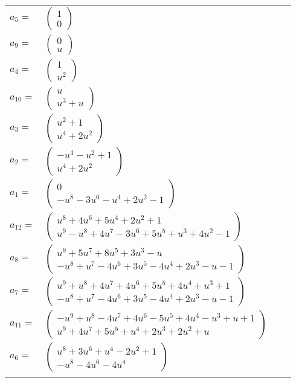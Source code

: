 \documentclass[1p]{elsarticle_modified}
\theoremstyle{definition}
\begin{document}
\begin{tabular}{m{7pt} m{180pt} m{7pt} m{180pt} }
\flushright $a_{5}=$&$\begin{pmatrix}1\\0\end{pmatrix}$ \\
\flushright $a_{9}=$&$\begin{pmatrix}0\\u\end{pmatrix}$ \\
\flushright $a_{4}=$&$\begin{pmatrix}1\\u^2\end{pmatrix}$ \\
\flushright $a_{10}=$&$\begin{pmatrix}u\\u^3+u\end{pmatrix}$ \\
\flushright $a_{3}=$&$\begin{pmatrix}u^2+1\\u^4+2 u^2\end{pmatrix}$ \\
\flushright $a_{2}=$&$\begin{pmatrix}- u^4- u^2+1\\u^4+2 u^2\end{pmatrix}$ \\
\flushright $a_{1}=$&$\begin{pmatrix}0\\- u^8-3 u^6- u^4+2 u^2-1\end{pmatrix}$ \\
\flushright $a_{12}=$&$\begin{pmatrix}u^8+4 u^6+5 u^4+2 u^2+1\\u^9- u^8+4 u^7-3 u^6+5 u^5+u^3+4 u^2-1\end{pmatrix}$ \\
\flushright $a_{8}=$&$\begin{pmatrix}u^9+5 u^7+8 u^5+3 u^3- u\\- u^8+u^7-4 u^6+3 u^5-4 u^4+2 u^3- u-1\end{pmatrix}$ \\
\flushright $a_{7}=$&$\begin{pmatrix}u^9+u^8+4 u^7+4 u^6+5 u^5+4 u^4+u^3+1\\- u^8+u^7-4 u^6+3 u^5-4 u^4+2 u^3- u-1\end{pmatrix}$ \\
\flushright $a_{11}=$&$\begin{pmatrix}- u^9+u^8-4 u^7+4 u^6-5 u^5+4 u^4- u^3+u+1\\u^9+4 u^7+5 u^5+u^4+2 u^3+2 u^2+u\end{pmatrix}$ \\
\flushright $a_{6}=$&$\begin{pmatrix}u^8+3 u^6+u^4-2 u^2+1\\- u^8-4 u^6-4 u^4\end{pmatrix}$\\&\end{tabular}
\end{document}
